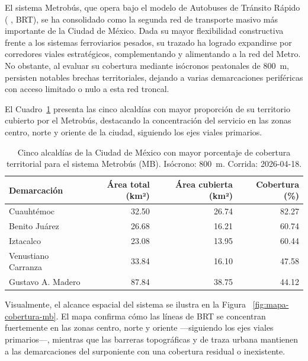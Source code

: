 El sistema Metrobús, que opera bajo el modelo de Autobuses de Tránsito Rápido (
, BRT), se ha consolidado como la segunda red de
transporte masivo más importante de la Ciudad de México. Dada su mayor
flexibilidad constructiva frente a los sistemas ferroviarios pesados, su trazado
ha logrado expandirse por corredores viales estratégicos, complementando y
alimentando a la red del Metro. No obstante, al evaluar su cobertura mediante
isócronos peatonales de 800~m, persisten notables brechas territoriales, dejando
a varias demarcaciones periféricas con acceso limitado o nulo a esta red
troncal.

El Cuadro~\ref{tab:cobertura-mb-cdmx} presenta las cinco alcaldías con mayor
proporción de su territorio cubierto por el Metrobús, destacando la
concentración del servicio en las zonas centro, norte y oriente de la ciudad,
siguiendo los ejes viales primarios.

\begin{table}[H]
    \centering
    \caption[Alcaldías con mayor cobertura de Metrobús (CDMX)]{
    Cinco alcaldías de la Ciudad de México con mayor porcentaje de cobertura
    territorial para el sistema Metrobús (MB). Isócrono: 800~m.
    Corrida: 2026-04-18.}
    \label{tab:cobertura-mb-cdmx}
    \begin{tabular}{|l|r|r|r|}
        \hline
        \textbf{Demarcación} & \textbf{Área total (km²)} & \textbf{Área cubierta (km²)} & \textbf{Cobertura (\%)} \\
        \hline
        Cuauhtémoc          & 32.50 &  26.74 &  82.27 \\
        Benito Juárez       & 26.68 &  16.21 &  60.74 \\
        Iztacalco           & 23.08 &  13.95 &  60.44 \\
        Venustiano Carranza & 33.84 &  16.10 &  47.58 \\
        Gustavo A. Madero   & 87.84 &  38.75 &  44.12 \\
        \hline
    \end{tabular}
\end{table}

Visualmente, el alcance espacial del sistema se ilustra en la Figura~
\ref{fig:mapa-cobertura-mb}. El mapa confirma cómo las líneas de BRT se
concentran fuertemente en las zonas centro, norte y oriente —siguiendo los ejes
viales primarios—, mientras que las barreras topográficas y de traza urbana
mantienen a las demarcaciones del surponiente con una cobertura residual o
inexistente.

